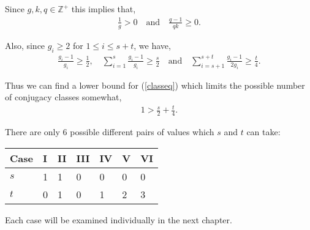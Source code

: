 Since $g,k,q \in \mathbb{Z}^+$ this implies that,
\begin{align*} \frac{1}{g} > 0 \quad \text{and} \quad \frac{q-1}{qk} \geq 0.
\end{align*} 

Also, since $g_i \geq 2$ for $1 \leq i \leq s + t$, we have,
\begin{align*} \frac{g_i-1}{g_i} \geq \frac{1}{2}, \quad \sum_{i=1}^{s} \frac{g_i-1}{g_i} \geq \frac{s}{2} \quad \text{and} \quad \sum_{i=s+1}^{s+t} \frac{g_i-1}{2g_i} \geq \frac{t}{4}.
\end{align*}

Thus we can find a lower bound for (\ref{classeq}) which limits the possible number of conjugacy classes somewhat,
\begin{align*} 1 > \frac{s}{2} + \frac{t}{4}.
\end{align*}

There are only 6 possible different pairs of values which $s$ and $t$ can take: \vspace{3mm}

\begin{center}
\centering
  \begin{tabular}{||P{1.5cm}||P{1cm}|P{1cm}|P{1cm}|P{1cm}|P{1cm}|P{1cm}||}
\hline
Case & I & II & III & IV & V & VI \\ [1ex]
\hline\hline
 $s$ & 1 & 1 & 0 & 0 & 0 & 0 \\ [1ex]
\hline
$t$ & 0 & 1 & 0 & 1 & 2 & 3 \\ [1ex]
 \hline
\end{tabular}
\end{center}
\vspace{2mm}

Each case will be examined individually in the next chapter.